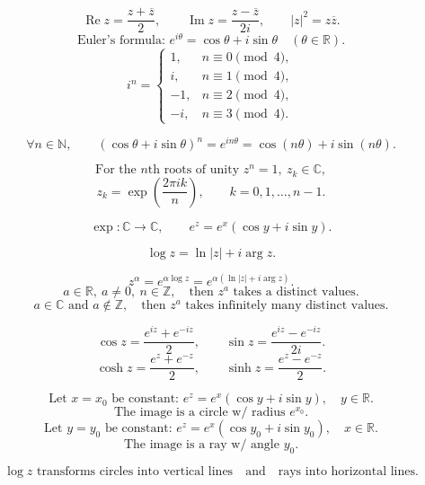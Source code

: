 \documentclass[11pt]{article}
\begin{document}


\[
\operatorname{Re} z=\frac{z+\overline z}{2},\qquad
\operatorname{Im} z=\frac{z-\overline z}{2i},\qquad
|z|^2=z\overline z.
\]
\[
\text{Euler's formula: } e^{i\theta}=\cos\theta+i\sin\theta \quad (\theta\in\mathbb R).
\]
\[
i^n=\begin{cases}
1, & n\equiv0\pmod4,\\
i, & n\equiv1\pmod4,\\
-1, & n\equiv2\pmod4,\\
-i, & n\equiv3\pmod4.
\end{cases}
\]

\[
\forall n\in\mathbb N,\qquad
(\cos\theta+i\sin\theta)^n=e^{in\theta}=\cos(n\theta)+i\sin(n\theta).
\]

\[
\text{For the } n\text{th roots of unity }z^n=1,\ z_k\in\mathbb C,
\]
\[
z_k=\exp\left(\frac{2\pi i k}{n}\right),\qquad k=0,1,\ldots,n-1.
\]

\[
\exp:\mathbb C\to\mathbb C,\qquad e^z=e^x(\cos y+i\sin y).
\]

\[
\log z=\ln |z|+i\arg z.
\]

\[
z^\alpha=e^{\alpha\log z}=e^{\alpha(\ln|z|+i\arg z)}.
\]
\[
a\in\mathbb R,\ a\ne0,\ n\in\mathbb Z,\quad \text{then }z^a
\text{ takes a distinct values.}
\]
\[
a\in\mathbb C \text{ and } a\notin\mathbb Z,\quad \text{then }z^a
\text{ takes infinitely many distinct values.}
\]

\[
\cos z=\frac{e^{iz}+e^{-iz}}{2},\qquad
\sin z=\frac{e^{iz}-e^{-iz}}{2i}.
\]
\[
\cosh z=\frac{e^z+e^{-z}}{2},\qquad
\sinh z=\frac{e^z-e^{-z}}{2}.
\]

\[
\text{Let } x=x_0 \text{ be constant: } e^z=e^x(\cos y+i\sin y),
\quad y\in\mathbb R.
\]
\[
\text{The image is a circle w/ radius } e^{x_0}.
\]
\[
\text{Let } y=y_0 \text{ be constant: } e^z=e^x(\cos y_0+i\sin y_0),
\quad x\in\mathbb R.
\]
\[
\text{The image is a ray w/ angle }y_0.
\]

\[
\log z \text{ transforms circles into vertical lines}
\quad\text{and}\quad
\text{rays into horizontal lines.}
\]

\end{document}
